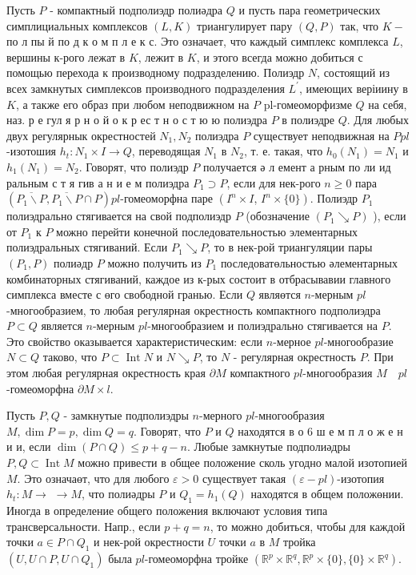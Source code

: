 \documentclass[10pt]{article}
\begin{document}
Пусть $P$ - компактный подполиэдр полиәдра $Q$ и пусть пара геометрических симплициальных комплексов $(L, K)$ триангулирует пару $(Q, P)$ так, что $K-$ по л пы й по д к о м п л е к с. Это означает, что каждый симплекс комплекса $L$, вершины к-рого лежат в $K$, лежит в $K$, и этого всегда можно добиться с помощью перехода к производному подразделению. Полиэдр $N$, состоящий из всех замкнутых симплексов производного подразделения $L^{\prime}$, имеющих веріиину в $K$, а также его образ при любом неподвижном на $P$ pl-гомеоморфизме $Q$ на себя, наз. р е гул я р н о й о к р ес т н о с т ю ю полиэдра $P$ в полиэдре $Q$. Для любых двух регулярнык окрестностей $N_{1}, N_{2}$ полиэдра $P$ существует неподвижная на $P p l$-изотошия $h_{t}: N_{1} \times I \rightarrow Q$, переводящая $N_{1}$ в $N_{2}$, т. е. такая, что $h_{0}\left(N_{1}\right)=N_{1}$ и $h_{1}\left(N_{1}\right)=N_{2}$. Говорят, что полиэдр $P$ получается ә л емент а рным по ли ид ральным с т я гив а н и е м полиэдра $P_{1} \supset P$, если для нек-рого $n \geqslant 0$ пара $\left(\overline{P_{1} \backslash P}, \overline{P_{1} \backslash P} \cap P\right) p l$-гомеоморфна паре $\left(I^{n} \times I\right.$, $\left.I^{n} \times\{0\}\right)$. Полиэдр $P_{1}$ полиэдрально стягивается на свой подполиэдр $P$ (обозначение $\left(P_{1} \searrow P\right)$ ), если от $P_{1}$ к $P$ можно перейти конечной последовательностью элементарных полиэдральных стягиваний. Если $P_{1} \searrow P$, то в нек-рой триангуляции пары $\left(P_{1}, P\right)$ полиәдр $P$ можно получить из $P_{1}$ последоватөльностью әлементарных комбинаторных стягиваний, каждое из к-рых состоит в отбрасывавии главного симплекса вместе с өго свободной гранью. Если $Q$ являөтся $n$-мерным $p l$-многообразием, то любая регулярная окрестность компактного подполиэдра $P \subset Q$ является $n$-мерным $p l$-многообразием и полиэдрально стягивается на $P$. Это свойство оказывается характеристическим: если $n$-мерное $p l$-многообразие $N \subset Q$ таково, что $P \subset \operatorname{Int} N$ и $N \searrow P$, то $N$ - регулярная окрестность $P$. При этом любая регулярная окрестность края $\partial M$ компактного $p l$-многообразия $M \quad p l$-гомеоморфна $\partial M \times l$.



Пусть $P, Q$ - замкнутые подполиэдры $n$-мерного $p l$-многообразия $M, \operatorname{dim} P=p, \operatorname{dim} Q=q$. Говорят, что $P$ и $Q$ находятся в о 6 ш е $м$ п л о ж е н и и, если $\operatorname{dim}(P \cap Q) \leqslant p+q-n$. Любые замкнутые подполиәдры $P, Q \subset \operatorname{Int} M$ можно привести в общее положение сколь угодно малой изотопией $M$. Это означаөт, что для любого $\varepsilon>0$ существует такая $(\varepsilon-p l)$-изотопия $h_{t}: M \rightarrow$ $\rightarrow M$, что полиәдры $P$ и $Q_{1}=h_{1}(Q)$ находятся в общем положөнии. Иногда в определение общего положения включают условия типа трансверсальности. Напр., если $p+q=n$, то можно добиться, чтобы для каждой точки $a \in P \cap Q_{1}$ и нек-рой окрестности $U$ точки $a$ в $M$ тройка $\left(U, U \cap P, U \cap Q_{1}\right)$ была $p l$-гомеоморфна тройке $\left(\mathbb{R}^{p} \times \mathbb{R}^{q}, \mathbb{R}^{p} \times\{0\},\{0\} \times \mathbb{R}^{q}\right)$.
\end{document}
